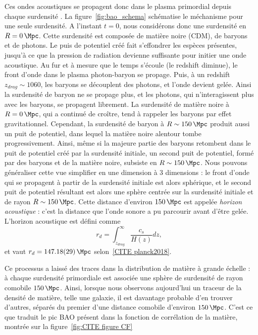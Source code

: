 \documentclass[11pt, twoside, a4paper, openright]{report}
\begin{document}
Ces ondes acoustiques se propagent donc dans le plasma primordial depuis chaque surdensité . La figure~\ref{fig:bao_schema} schématise le méchanisme pour une seule surdensité. A l'instant $t=0$, nous considérons donc une surdensité en $R = \SI{0}{\Mpc}$. Cette surdensité est composée de matière noire (CDM), de baryons et de photons. Le puis de potentiel créé fait s'effondrer les espèces présentes, jusqu'à ce que la pression de radiation devienne suffisante pour initier une onde acoustique. Au fur et à mesure que le temps s'écoule (le redshift diminue), le front d'onde dans le plasma photon-baryon se propage. Puis, à un redshift $z_{drag} \sim 1060$, les baryons se découplent des photons, et l'onde devient gelée. Ainsi la surdensité de baryon ne se propage plus, et les photons, qui n'interagissent plus avec les baryons, se propagent librement. La surdensité de matière noire à $R = \SI{0}{\Mpc}$, qui a continué de croître, tend à rappeler les baryons par effet gravitationnel. Cependant, la surdensité de baryon à $R \sim \SI{150}{\Mpc}$ produit aussi un puit de potentiel, dans lequel la matière noire alentour tombe progressivement. Ainsi, même si la majeure partie des baryons retombent dans le puit de potentiel créé par la surdensité initiale, un second puit de potentiel, formé par des baryons et de la matière noire, subsiste en $R \sim \SI{150}{\Mpc}$. Nous pouvons généraliser cette vue simplifier en une dimension à 3 dimensions : le front d'onde qui se propagent à partir de la surdensité initiale est alors sphérique, et le second puit de potentiel résultant est alors une sphère centrée sur la surdensité initiale et de rayon $R \sim \SI{150}{\Mpc}$. Cette distance d'environ $\SI{150}{\Mpc}$ est appelée \emph{horizon acoustique} : c'est la distance que l'onde sonore a pu parcourir avant d'être gelée. L'horizon acoustique est défini comme
\begin{equation}
  \label{eq:sound_horizon}
  r_{d} = \int^{\infty}_{z_{drag}} \frac{c_{s}}{H(z)} dz ,
\end{equation}
et vaut $r_{d} = \SI{147.18(29)}{\Mpc}$ selon~\ref{CITE planck2018}.

Ce processus a laissé des traces dans la distribution de matière à grande échelle : à chaque surdensité primordiale est associée une sphère de surdensité de rayon comobile $\SI{150}{\Mpc}$. Ainsi, lorsque nous observons aujourd'hui un traceur de la densité de matière, telle une galaxie, il est davantage probable d'en trouver d'autres, séparés du premier d'une distance comobile d'environ $\SI{150}{\Mpc}$. C'est ce que traduit le pic BAO présent dans la fonction de corrélation de la matière, montrée sur la figure~\ref{fig:CITE figure CF}
\end{document}

